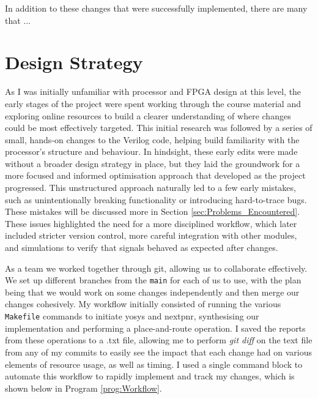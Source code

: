 \documentclass[a4paper,10pt]{article}
\begin{document}
In addition to these changes that were successfully implemented,
there are many that ...

\newpage

\section{Design Strategy}
\label{sec:Design_Strategy}

As I was initially unfamiliar with processor and FPGA design at this level, 
the early stages of the project were spent working through the course material 
and exploring online resources to build a clearer understanding of 
where changes could be most effectively targeted. 
This initial research was followed by a series of small, 
hands-on changes to the Verilog code, 
helping build familiarity with the processor's structure and behaviour.
In hindsight, these early edits were made 
without a broader design strategy in place, 
but they laid the groundwork for a more focused and informed optimisation approach 
that developed as the project progressed.
This unstructured approach naturally led to a few early mistakes, 
such as unintentionally breaking functionality or introducing hard-to-trace bugs.
These mistakes will be discussed more in Section \ref{sec:Problems_Encountered}.
These issues highlighted the need for a more disciplined workflow, 
which later included stricter version control, 
more careful integration with other modules, 
and simulations to verify that signals behaved as expected after changes.

As a team we worked together through git, allowing us to collaborate effectively.
We set up different branches from the \texttt{main} for each of us to use, 
with the plan being that we would work on some changes independently 
and then merge our changes cohesively.
My workflow initially consisted of running the various \texttt{Makefile}
commands to initiate yosys and nextpnr, 
synthesising our implementation and performing a place-and-route operation.
I saved the reports from these operations to a .txt file, 
allowing me to perform \textit{git diff} on the text file 
from any of my commits to easily see the impact that each change had 
on various elements of resource usage, as well as timing.
I used a single command block to automate this workflow 
to rapidly implement and track my changes, 
which is shown below in Program \ref{prog:Workflow}.
\end{document}
